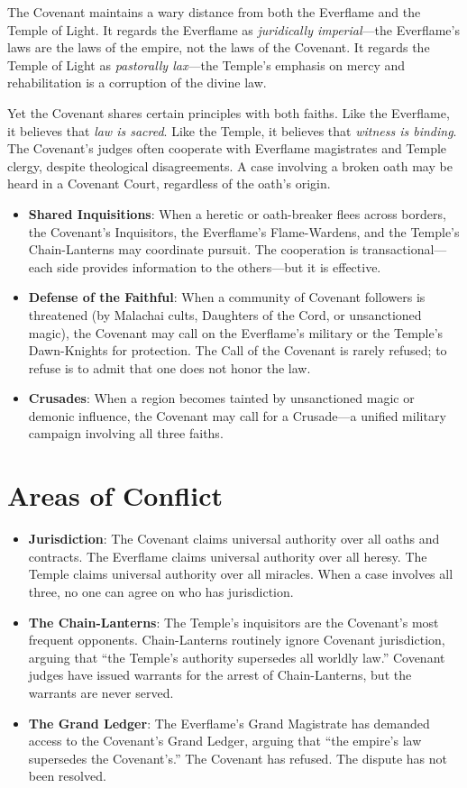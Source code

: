 \documentclass{book}
\begin{document}
The Covenant maintains a wary distance from both the Everflame and the Temple of Light. It regards the Everflame as \textit{juridically imperial}---the Everflame's laws are the laws of the empire, not the laws of the Covenant. It regards the Temple of Light as \textit{pastorally lax}---the Temple's emphasis on mercy and rehabilitation is a corruption of the divine law.

Yet the Covenant shares certain principles with both faiths. Like the Everflame, it believes that \textit{law is sacred}. Like the Temple, it believes that \textit{witness is binding}. The Covenant's judges often cooperate with Everflame magistrates and Temple clergy, despite theological disagreements. A case involving a broken oath may be heard in a Covenant Court, regardless of the oath's origin.

\begin{itemize}
\item \textbf{Shared Inquisitions}: When a heretic or oath-breaker flees across borders, the Covenant's Inquisitors, the Everflame's Flame-Wardens, and the Temple's Chain-Lanterns may coordinate pursuit. The cooperation is transactional---each side provides information to the others---but it is effective.
\item \textbf{Defense of the Faithful}: When a community of Covenant followers is threatened (by Malachai cults, Daughters of the Cord, or unsanctioned magic), the Covenant may call on the Everflame's military or the Temple's Dawn-Knights for protection. The Call of the Covenant is rarely refused; to refuse is to admit that one does not honor the law.
\item \textbf{Crusades}: When a region becomes tainted by unsanctioned magic or demonic influence, the Covenant may call for a Crusade---a unified military campaign involving all three faiths.
\end{itemize}

\section{Areas of Conflict}

\begin{itemize}
\item \textbf{Jurisdiction}: The Covenant claims universal authority over all oaths and contracts. The Everflame claims universal authority over all heresy. The Temple claims universal authority over all miracles. When a case involves all three, no one can agree on who has jurisdiction.
\item \textbf{The Chain-Lanterns}: The Temple's inquisitors are the Covenant's most frequent opponents. Chain-Lanterns routinely ignore Covenant jurisdiction, arguing that ``the Temple's authority supersedes all worldly law.'' Covenant judges have issued warrants for the arrest of Chain-Lanterns, but the warrants are never served.
\item \textbf{The Grand Ledger}: The Everflame's Grand Magistrate has demanded access to the Covenant's Grand Ledger, arguing that ``the empire's law supersedes the Covenant's.'' The Covenant has refused. The dispute has not been resolved.
\end{itemize}
\end{document}
